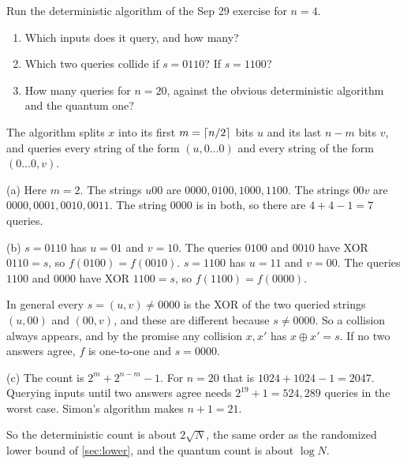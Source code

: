 \begin{exercisebox}
\begin{pproblem}[Deterministic Simon for $n = 4$]\label{pp:det-simon}
    Run the deterministic algorithm of the Sep 29 exercise for $n = 4$.
    \begin{enumerate}[label=(\alph*)]
        \item Which inputs does it query, and how many?
        \item Which two queries collide if $s = 0110$? If $s = 1100$?
        \item How many queries for $n = 20$, against the obvious deterministic algorithm and the
              quantum one?
    \end{enumerate}
\end{pproblem}
\tcblower
\begin{wsolution}
    The algorithm splits $x$ into its first $m = \left\lceil n/2\right\rceil$ bits $u$ and its last $n - m$
    bits $v$, and queries every string of the form $(u, 0 \dots 0)$ and every string of the form
    $(0 \dots 0, v)$.

    (a) Here $m = 2$. The strings $u00$ are $0000, 0100, 1000, 1100$. The strings $00v$ are
    $0000, 0001, 0010, 0011$. The string $0000$ is in both, so there are $4 + 4 - 1 = 7$ queries.

    (b) $s = 0110$ has $u = 01$ and $v = 10$. The queries $0100$ and $0010$ have XOR $0110 = s$, so
    $f(0100) = f(0010)$. $s = 1100$ has $u = 11$ and $v = 00$. The queries $1100$ and $0000$ have
    XOR $1100 = s$, so $f(1100) = f(0000)$.

    In general every $s = (u, v) \neq 0000$ is the XOR of the two queried strings $(u, 00)$ and
    $(00, v)$, and these are different because $s \neq 0000$. So a collision always appears, and by
    the promise any collision $x, x'$ has $x \oplus x' = s$. If no two answers agree, $f$ is
    one-to-one and $s = 0000$.

    (c) The count is $2^m + 2^{n-m} - 1$. For $n = 20$ that is $1024 + 1024 - 1 = 2047$. Querying
    inputs until two answers agree needs $2^{19} + 1 = 524{,}289$ queries in the worst case. Simon's
    algorithm makes $n + 1 = 21$.

    So the deterministic count is about $2\sqrt{N}$, the same order as the randomized lower bound of
    \cref{sec:lower}, and the quantum count is about $\log N$.
\end{wsolution}
\end{exercisebox}

